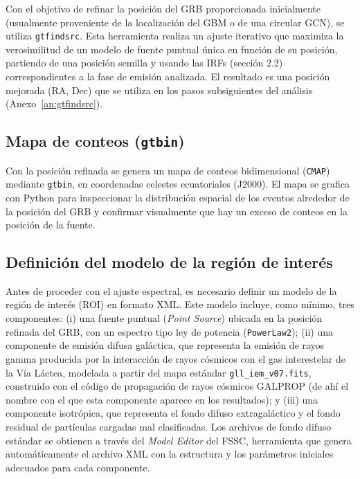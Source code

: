Con el objetivo de refinar la posición del GRB proporcionada inicialmente (usualmente proveniente de la localización del GBM o de una circular GCN), se utiliza \texttt{gtfindsrc}. Esta herramienta realiza un ajuste iterativo que maximiza la verosimilitud de un modelo de fuente puntual única en función de su posición, partiendo de una posición semilla y usando las IRFs (sección 2.2) correspondientes a la fase de emisión analizada. El resultado es una posición mejorada (RA, Dec) que se utiliza en los pasos subsiguientes del análisis (Anexo~\ref{an:gtfindsrc}).

\subsection{Mapa de conteos (\texttt{gtbin})}

Con la posición refinada se genera un mapa de conteos bidimensional (\texttt{CMAP}) mediante \texttt{gtbin}, en coordenadas celestes ecuatoriales (J2000). El mapa se grafica con Python para inspeccionar la distribución espacial de los eventos alrededor de la posición del GRB y confirmar visualmente que hay un exceso de conteos en la posición de la fuente.

\subsection{Definición del modelo de la región de interés}

Antes de proceder con el ajuste espectral, es necesario definir un modelo de la región de interés (ROI) en formato XML. Este modelo incluye, como mínimo, tres componentes: (i) una fuente puntual (\textit{Point Source}) ubicada en la posición refinada del GRB, con un espectro tipo ley de potencia (\texttt{PowerLaw2}); (ii) una componente de emisión difusa galáctica, que representa la emisión de rayos gamma producida por la interacción de rayos cósmicos con el gas interestelar de la Vía Láctea, modelada a partir del mapa estándar \texttt{gll\_iem\_v07.fits}, construido con el código de propagación de rayos cósmicos GALPROP (de ahí el nombre con el que esta componente aparece en los resultados); y (iii) una componente isotrópica, que representa el fondo difuso extragaláctico y el fondo residual de partículas cargadas mal clasificadas. Los archivos de fondo difuso estándar se obtienen a través del \textit{Model Editor} del FSSC, herramienta que genera automáticamente el archivo XML con la estructura y los parámetros iniciales adecuados para cada componente.

